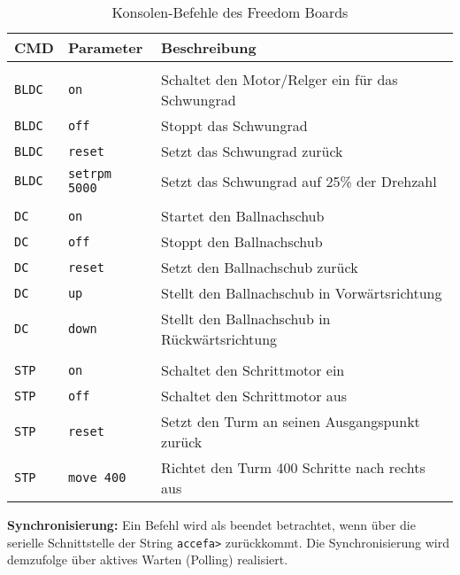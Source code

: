 \begin{table}[h!]
	\centering
	\renewcommand{\arraystretch}{1.5}
	\begin{tabular}{l l l}
		\textbf{CMD}	& \textbf{Parameter}	& \textbf{Beschreibung} \\
		\hline
		& & \\
		\texttt{BLDC} 	& \texttt{on} 		& Schaltet den Motor/Relger ein für das Schwungrad	\\
		\texttt{BLDC} 	& \texttt{off}		& Stoppt das Schwungrad					\\ 
		\texttt{BLDC} 	& \texttt{reset}	& Setzt das Schwungrad zurück				\\ 
		\texttt{BLDC} 	& \texttt{setrpm 5000}	& Setzt das Schwungrad auf 25\% der Drehzahl		\\ 
		& & \\
		\texttt{DC}	& \texttt{on}		& Startet den Ballnachschub				\\
		\texttt{DC}	& \texttt{off}		& Stoppt den Ballnachschub				\\ 
		\texttt{DC} 	& \texttt{reset}	& Setzt den Ballnachschub zurück			\\ 
		\texttt{DC}	& \texttt{up}		& Stellt den Ballnachschub in Vorwärtsrichtung		\\ 
		\texttt{DC}	& \texttt{down}		& Stellt den Ballnachschub in Rückwärtsrichtung		\\
		& & \\
		\texttt{STP} 	& \texttt{on}		& Schaltet den Schrittmotor ein 			\\ 
		\texttt{STP} 	& \texttt{off}		& Schaltet den Schrittmotor aus 			\\ 
		\texttt{STP}	& \texttt{reset}	& Setzt den Turm an seinen Ausgangspunkt zurück 	\\ 
		\texttt{STP} 	& \texttt{move 400}	& Richtet den Turm 400 Schritte nach rechts aus 	\\ 
	\end{tabular} 
	\caption{Konsolen-Befehle des Freedom Boards}
	\label{tab:freedom-board-konsolen-befehle}
\end{table}

\noindent
\textbf{Synchronisierung:} Ein Befehl wird als beendet betrachtet, wenn über die serielle Schnittstelle der String \texttt{accefa>} zurückkommt. Die Synchronisierung wird demzufolge über aktives Warten (Polling) realisiert.
